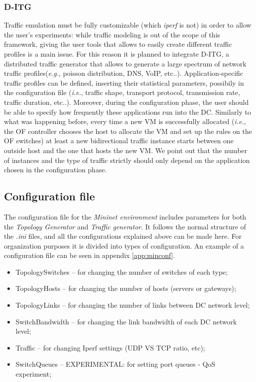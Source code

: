 \documentclass[12pt,english,oneside]{book}
\begin{document}
\subsubsection{D-ITG}
\hspace{0.6cm}

Traffic emulation must be fully customizable (which \textit{iperf} is not) in order to allow the user's experiments: while traffic modeling is out of the scope of this framework, giving the user tools that allows to easily create different traffic profiles is a main issue.
For this reason it is planned to integrate D-ITG\cite{gitg}, a distributed traffic generator that allows to generate a large spectrum of network traffic profiles({\it e.g.}, poisson distribution, DNS, VoIP, etc..).
Application-specific traffic profiles can be defined, inserting their statistical parameters, possibily in the configuration file ({\it i.e.}, traffic shape, transport protocol, transmission rate, traffic duration, etc..).
Moreover, during the configuration phase, the user should be able to specify how frequently these applications run into the DC.
Similarly to what was happening before, every time a new VM is successfully allocated ({\it i.e.}, the OF controller chooses the host to allocate the VM and set up the rules on the OF switches) at least a new bidirectional traffic instance starts between one outside host and the one that hosts the new VM.
We point out that the number of instances and the type of traffic strictly should only depend on the application chosen in the configuration phase.

\subsection{Configuration file}
\hspace{0.6cm}

The configuration file for the \textit{Mininet environment} includes parameters for both the \textit{Topology Generator} and \textit{Traffic generator}.
It follows the normal structure of the \textit{.ini} files, and all the configurations explained above can be made here. For organization purposes it is divided into types of configuration. An example of a configuration file can be seen in appendix \ref{app:minconf}.

\begin{itemize}
  \item TopologySwitches -- for changing the number of switches of each type;
  \item TopologyHosts -- for changing the number of hosts (servers or gateways);
  \item TopologyLinks -- for changing the number of links between DC network level;
  \item SwitchBandwidth -- for changing the link bandwidth of each DC network level;
  \item Traffic -- for changing Iperf settings (UDP VS TCP ratio, etc);
  \item SwitchQueues -- EXPERIMENTAL: for setting port queues - QoS experiment;
\end{itemize}
\end{document}
